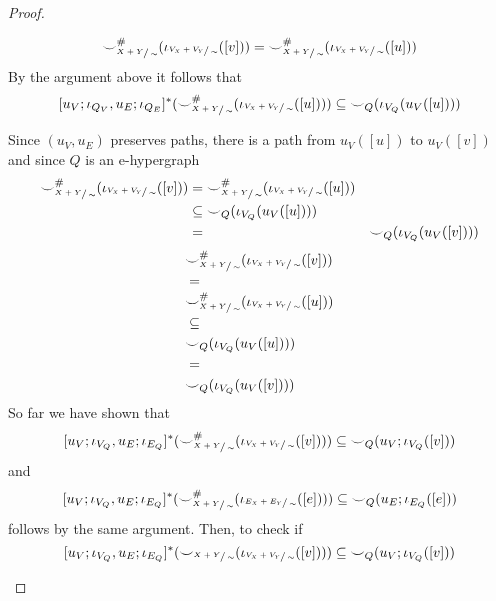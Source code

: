 \begin{proof}
\begin{enumerate}
\begin{itemize}
        \[
            {\smile}_{\sfrac{X+Y}{\sim}}^{{\#}}(\iota_{\sfrac{V_{X} + V_{Y}}{\sim}}([v])) = {\smile}_{\sfrac{X+Y}{\sim}}^{{\#}}(\iota_{\sfrac{V_{X} + V_{Y}}{\sim}}([u]))    
        \]
        By the argument above it follows that
        \[
            [u_{V};\iota_{Q_{V}},u_{E};\iota_{Q_{E}}]^{*}({\smile}_{\sfrac{X+Y}{\sim}}^{{\#}}(\iota_{\sfrac{V_{X} + V_{Y}}{\sim}}([u]))) \subseteq {\smile}_{Q}(\iota_{V_{Q}}(u_{V}([u])))
        \]
        \end{itemize}
       Since $(u_{V},u_{E})$ preserves paths, there is a path from $u_{V}([u])$ to $u_{V}([v])$ and since $Q$ is an e-hypergraph
       \ifdefined \ONECOLUMN
       \begin{align*}
        {\smile}_{\sfrac{X+Y}{\sim}}^{{\#}}(\iota_{\sfrac{V_{X} + V_{Y}}{\sim}}([v]))
        &=
        {\smile}_{\sfrac{X+Y}{\sim}}^{{\#}}(\iota_{\sfrac{V_{X} + V_{Y}}{\sim}}([u]))\\
        &\subseteq
        {\smile}_{Q}(\iota_{V_{Q}}(u_{V}([u])))\\
        &=
        &{\smile}_{Q}(\iota_{V_{Q}}(u_{V}([v])))
       \end{align*}
       \else
       \begin{align*}
        &{\smile}_{\sfrac{X+Y}{\sim}}^{{\#}}(\iota_{\sfrac{V_{X} + V_{Y}}{\sim}}([v]))\\
        &=\\
        &{\smile}_{\sfrac{X+Y}{\sim}}^{{\#}}(\iota_{\sfrac{V_{X} + V_{Y}}{\sim}}([u]))\\
        &\subseteq\\
        &{\smile}_{Q}(\iota_{V_{Q}}(u_{V}([u])))\\
        &=\\
        &{\smile}_{Q}(\iota_{V_{Q}}(u_{V}([v])))
    \end{align*}
    \fi
       So far we have shown that
       \[
        [u_{V};\iota_{V_{Q}}, u_{E};\iota_{E_{Q}}]^{*}({\smile}_{\sfrac{X+Y}{\sim}}^{{\#}}(\iota_{\sfrac{V_{X} + V_{Y}}{\sim}}([v]))) \subseteq {\smile}_{Q}(u_{V};\iota_{V_{Q}}([v]))
       \]
       and
       \[
        [u_{V};\iota_{V_{Q}}, u_{E};\iota_{E_{Q}}]^{*}({\smile}_{\sfrac{X+Y}{\sim}}^{{\#}}(\iota_{\sfrac{E_{X} + E_{Y}}{\sim}}([e]))) \subseteq {\smile}_{Q}(u_{E};\iota_{E_{Q}}([e]))
       \] follows by the same argument.
       Then, to check if
       \[
        [u_{V};\iota_{V_{Q}}, u_{E};\iota_{E_{Q}}]^{*}({\smile}_{\sfrac{X+Y}{\sim}}(\iota_{\sfrac{V_{X} + V_{Y}}{\sim}}([v]))) \subseteq {\smile}_{Q}(u_{V};\iota_{V_{Q}}([v]))
\]
\end{enumerate}
\end{proof}
